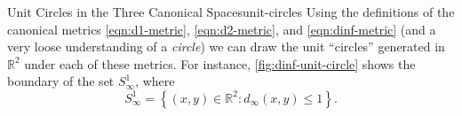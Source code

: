 \documentclass{article}
\numberwithin{equation}{section}
\numberwithin{figure}{section}
\begin{document}
\begin{example}{Unit Circles in the Three Canonical Spaces}{unit-circles}
    Using the definitions of the canonical metrics \cref{eqn:d1-metric},
    \cref{eqn:d2-metric}, and \cref{eqn:dinf-metric} (and a very loose
    understanding of a \emph{circle}) we can draw the unit ``circles'' generated
    in $ \mathbb{R}^2 $ under each of these metrics. For instance,
    \cref{fig:dinf-unit-circle} shows the boundary of the set $ S^1_\infty $,
    where
    \begin{equation}
        S^1_\infty = \left\{ (x, y) \in \mathbb{R}^2 \colon d_\infty(x, y) \leq
        1 \right\}.
    \end{equation}

    \begin{minipage}{.3\linewidth}
        \centering
    \end{minipage}\hfill
    \begin{minipage}{.3\linewidth}
        \centering
    \end{minipage}\hfill
    \begin{minipage}{.3\linewidth}
        \centering
        \label{fig:dinf-unit-circle}
    \end{minipage}
\end{example}
\end{document}
